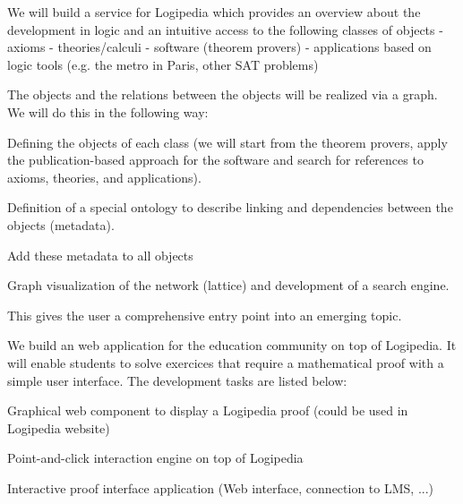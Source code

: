 \begin{workpackage}[id=dissemination,type=MGT,wphases=1-48,
  short={Dissemination},
  title={Dissemination, communication and exploitation},
  lead=Inr,InrRM=12,BirRM=4,InrRM=4,ImtRM=2,StrRM=2,ZibRM=14,EduRM=12]
\begin{tasklist}
  \begin{task}[id=zib,
      title=Linking scientific publications to Logipedia,
      lead=Zib,ZibRM=12,wphases=12-23]
    We will build a service for Logipedia which provides an overview
    about the development in logic and an intuitive access to the
    following classes of objects - axioms - theories/calculi -
    software (theorem provers) - applications based on logic tools
    (e.g. the metro in Paris, other SAT problems)

    The objects and the relations between the objects will be
    realized via a graph. We will do this in the following way:
    \begin{compactitem}
    \item Defining the objects of each class (we will start from the
      theorem provers, apply the publication-based approach for the
      software and search for references to axioms, theories, and
      applications).
    \item Definition of a special ontology to describe linking and
      dependencies between the objects (metadata).
    \item Add these metadata to all objects
    \item Graph visualization of the network (lattice) and development
      of a search engine.
    \end{compactitem}
    This gives the user a comprehensive entry point into an emerging
    topic.
  \end{task}

  \begin{task}[id=edukera,
      title=Web interface for doing proofs at school,
      lead=Edu,EduRM=12,wphases=12-23]
    We build an web application for the education community on top of Logipedia. It will enable students to solve exercices that require
    a mathematical proof with a simple user interface.
    The development tasks are listed below:
    \begin{compactitem}
    \item Graphical web component to display a Logipedia proof (could be used in Logipedia website)
    \item Point-and-click interaction engine on top of Logipedia
    \item Interactive proof interface application (Web interface, connection to LMS, ...)
    \end{compactitem}
  \end{task}


\end{tasklist}
\end{workpackage}
